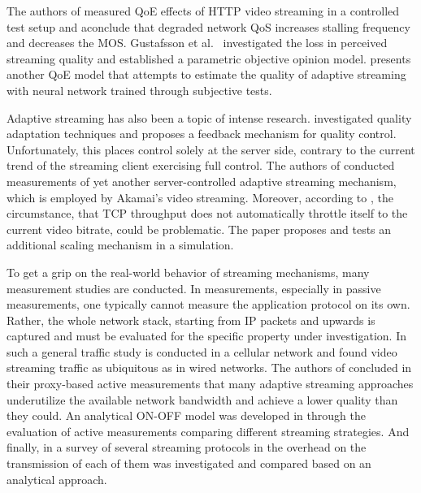 The authors of \cite{mokmeasuring} measured \gls{QoE} effects of \gls{HTTP} video streaming in a controlled test setup and aconclude that degraded network \gls{QoS} increases stalling frequency and decreases the \gls{MOS}. Gustafsson et al.~\cite{gustafsson2008measuring} investigated the loss in perceived streaming quality and established a parametric objective opinion model. \cite{6181070} presents another \gls{QoE} model that attempts to estimate the quality of adaptive streaming with neural network trained through subjective tests.

Adaptive streaming has also been a topic of intense research. \cite{DeCicco:2011:FCA:1943552.1943573} investigated quality adaptation techniques and proposes a feedback mechanism for quality control. Unfortunately, this places control solely at the server side, contrary to the current trend of the streaming client exercising full control. The authors of \cite{cicco2010akamai} conducted measurements of yet another server-controlled adaptive streaming mechanism, which is employed by Akamai's video streaming. Moreover, according to \cite{5945211}, the circumstance, that \gls{TCP} throughput does not automatically throttle itself to the current video bitrate, could be problematic. The paper proposes and tests an additional scaling mechanism in a simulation.

To get a grip on the real-world behavior of streaming mechanisms, many measurement studies are conducted. In measurements, especially in passive measurements, one typically cannot measure the application protocol on its own. Rather, the whole network stack, starting from \gls{IP} packets and upwards is captured and must be evaluated for the specific property under investigation. In \cite{Erman:2011:OTV:2068816.2068829} such a general traffic study is conducted in a cellular network and found video streaming traffic as ubiquitous as in wired networks. The authors of \cite{Huang:2012:CTU:2398776.2398800} concluded in their proxy-based active measurements that many adaptive streaming approaches underutilize the available network bandwidth and achieve a lower quality than they could. An analytical ON-OFF model was developed in \cite{Rao:2011:NCV:2079296.2079321} through the evaluation of active measurements comparing different streaming strategies. And finally, in a survey of several streaming protocols in \cite{5703713} the overhead on the transmission of each of them was investigated and compared based on an analytical approach. 


